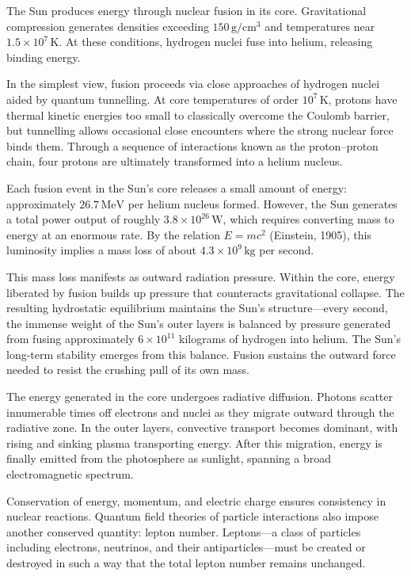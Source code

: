 The Sun produces energy through nuclear fusion in its core. Gravitational compression generates densities exceeding $150\,\text{g}/\text{cm}^3$ and temperatures near $1.5 \times 10^7\,\text{K}$. At these conditions, hydrogen nuclei fuse into helium, releasing binding energy.

In the simplest view, fusion proceeds via close approaches of hydrogen nuclei aided by quantum tunnelling. At core temperatures of order $10^7\,\text{K}$, protons have thermal kinetic energies too small to classically overcome the Coulomb barrier, but tunnelling allows occasional close encounters where the strong nuclear force binds them. Through a sequence of interactions known as the proton–proton chain, four protons are ultimately transformed into a helium nucleus. 

Each fusion event in the Sun's core releases a small amount of energy: approximately $26.7\,\text{MeV}$ per helium nucleus formed. However, the Sun generates a total power output of roughly $3.8 \times 10^{26}\,\text{W}$, which requires converting mass to energy at an enormous rate. By the relation $E = mc^2$ (Einstein, 1905), this luminosity implies a mass loss of about $4.3 \times 10^9\,\text{kg}$ per second.

This mass loss manifests as outward radiation pressure. Within the core, energy liberated by fusion builds up pressure that counteracts gravitational collapse. The resulting hydrostatic equilibrium maintains the Sun's structure—every second, the immense weight of the Sun's outer layers is balanced by pressure generated from fusing approximately $6 \times 10^{11}$ kilograms of hydrogen into helium. The Sun's long-term stability emerges from this balance. Fusion sustains the outward force needed to resist the crushing pull of its own mass.

The energy generated in the core undergoes radiative diffusion. Photons scatter innumerable times off electrons and nuclei as they migrate outward through the radiative zone. In the outer layers, convective transport becomes dominant, with rising and sinking plasma transporting energy. After this migration, energy is finally emitted from the photosphere as sunlight, spanning a broad electromagnetic spectrum.

Conservation of energy, momentum, and electric charge ensures consistency in nuclear reactions. Quantum field theories of particle interactions also impose another conserved quantity: lepton number. Leptons—a class of particles including electrons, neutrinos, and their antiparticles—must be created or destroyed in such a way that the total lepton number remains unchanged.

